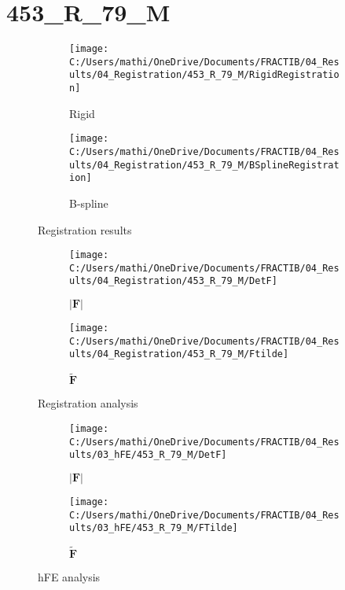 \documentclass{article}%
\begin{document}
%
\newpage%
\section*{453\_R\_79\_M}%
\label{sec:453R79M}%


\begin{figure}[h!]%
\begin{subfigure}[b]{0.5\linewidth}%
\texttt{[image: C:/Users/mathi/OneDrive/Documents/FRACTIB/04\_Results/04\_Registration/453\_R\_79\_M/RigidRegistration]}%
\caption{Rigid}%
\end{subfigure}%
\begin{subfigure}[b]{0.5\linewidth}%
\texttt{[image: C:/Users/mathi/OneDrive/Documents/FRACTIB/04\_Results/04\_Registration/453\_R\_79\_M/BSplineRegistration]}%
\caption{B{-}spline}%
\end{subfigure}%
\caption{Registration results}%
\end{figure}

%


\begin{figure}[h!]%
\begin{subfigure}[b]{0.5\linewidth}%
\texttt{[image: C:/Users/mathi/OneDrive/Documents/FRACTIB/04\_Results/04\_Registration/453\_R\_79\_M/DetF]}%
\caption{$|\mathbf{F}|$}%
\end{subfigure}%
\begin{subfigure}[b]{0.5\linewidth}%
\texttt{[image: C:/Users/mathi/OneDrive/Documents/FRACTIB/04\_Results/04\_Registration/453\_R\_79\_M/Ftilde]}%
\caption{$\tilde{\mathbf{F}}$}%
\end{subfigure}%
\caption{Registration analysis}%
\end{figure}

%


\begin{figure}[h!]%
\begin{subfigure}[b]{0.5\linewidth}%
\texttt{[image: C:/Users/mathi/OneDrive/Documents/FRACTIB/04\_Results/03\_hFE/453\_R\_79\_M/DetF]}%
\caption{$|\mathbf{F}|$}%
\end{subfigure}%
\begin{subfigure}[b]{0.5\linewidth}%
\texttt{[image: C:/Users/mathi/OneDrive/Documents/FRACTIB/04\_Results/03\_hFE/453\_R\_79\_M/FTilde]}%
\caption{$\tilde{\mathbf{F}}$}%
\end{subfigure}%
\caption{hFE analysis}%
\end{figure}
\end{document}
